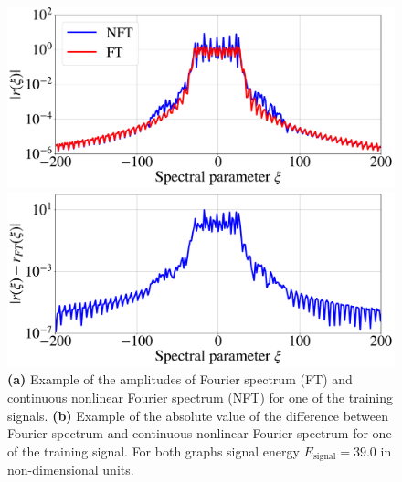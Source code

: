\begin{figure}[ht]
\centering
\begin{minipage}{.49\textwidth}
  \centering
  \includegraphics[width=1.\linewidth]{images/nn_nft/scirep_ft_vs_nft_actual.pdf}
  \caption{}
  \label{fig:nft_and_ft_a}
\end{minipage}%
\begin{minipage}{.49\textwidth}
  \centering
  \includegraphics[width=1.\linewidth]{images/nn_nft/scirep_ft_vs_nft.pdf}
  \caption{}
  \label{fig:nft_and_ft_b}
\end{minipage}

\caption{\textbf{(a)} Example of the amplitudes of Fourier spectrum (FT) and continuous nonlinear Fourier spectrum (NFT) for one of the training signals. \textbf{(b)} Example of the absolute value of the difference between Fourier spectrum and continuous nonlinear Fourier spectrum for one of the training signal. For both graphs signal energy $E_{\text{signal}} = 39.0$ in non-dimensional units.}
\label{fig:nft_and_ft}
\end{figure}

